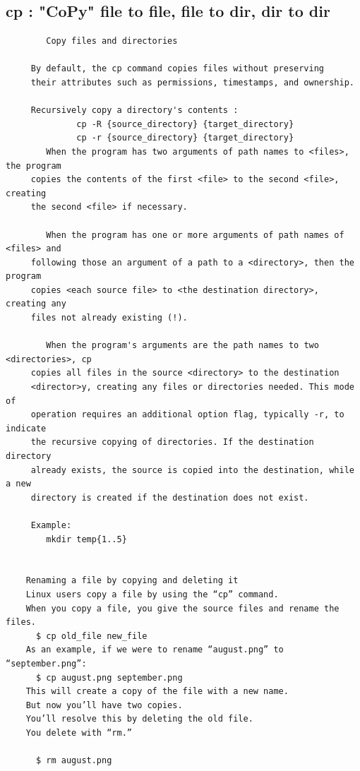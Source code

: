 \documentclass[a4paper,12pt]{article}
\begin{document}
\subsection{cp       : "CoPy" file to file, file to dir, dir to dir}
\begin{verbatim}
        Copy files and directories
     
     By default, the cp command copies files without preserving 
     their attributes such as permissions, timestamps, and ownership. 
     
     Recursively copy a directory's contents : 
              cp -R {source_directory} {target_directory}
              cp -r {source_directory} {target_directory}
        When the program has two arguments of path names to <files>, the program      
     copies the contents of the first <file> to the second <file>, creating  
     the second <file> if necessary.
     
        When the program has one or more arguments of path names of <files> and   
     following those an argument of a path to a <directory>, then the program   
     copies <each source file> to <the destination directory>, creating any 
     files not already existing (!).

        When the program's arguments are the path names to two <directories>, cp
     copies all files in the source <directory> to the destination 
     <director>y, creating any files or directories needed. This mode of 
     operation requires an additional option flag, typically -r, to indicate 
     the recursive copying of directories. If the destination directory 
     already exists, the source is copied into the destination, while a new 
     directory is created if the destination does not exist.
     
     Example:
        mkdir temp{1..5}
    
    
    Renaming a file by copying and deleting it
    Linux users copy a file by using the “cp” command. 
    When you copy a file, you give the source files and rename the files. 
      $ cp old_file new_file
    As an example, if we were to rename “august.png” to “september.png”:
      $ cp august.png september.png
    This will create a copy of the file with a new name. 
    But now you’ll have two copies. 
    You’ll resolve this by deleting the old file. 
    You delete with “rm.”

      $ rm august.png
    
     
\end{verbatim}
\end{document}
